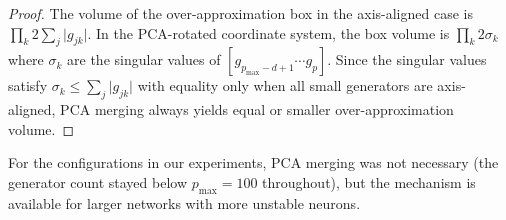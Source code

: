 \documentclass[11pt]{article}
\newcommand{\abs}[1]{\lvert #1 \rvert}
\begin{document}
\begin{proof}
The volume of the over-approximation box in the axis-aligned case is
$\prod_k 2\sum_j \abs{g_{jk}}$. In the PCA-rotated coordinate system, the
box volume is $\prod_k 2\sigma_k$ where $\sigma_k$ are the singular values
of $[g_{p_{\max}-d+1} \cdots g_p]$. Since the singular values satisfy
$\sigma_k \leq \sum_j \abs{g_{jk}}$ with equality only when all small
generators are axis-aligned, PCA merging always yields equal or smaller
over-approximation volume.
\end{proof}

For the configurations in our experiments, PCA merging was not necessary
(the generator count stayed below $p_{\max} = 100$ throughout), but the
mechanism is available for larger networks with more unstable neurons.
\end{document}

